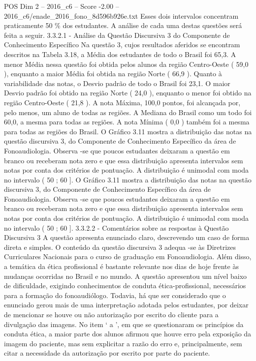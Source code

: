 \begin{textsample}{POS Dim 2 – 2016\_c6 – Score -2.00 – 2016\_c6/enade\_2016\_fono\_8d596b926e.txt}
Esses dois intervalos concentram praticamente 50 \% dos estudantes.
A análise de cada uma destas questões será feita a seguir. 3.3.2.1 - Análise da Questão Discursiva 3 do Componente de Conhecimento Específico Na questão 3, cujos resultados aferidos se encontram descritos na Tabela 3.18, a Média dos estudantes de todo o Brasil foi 65,3.
A menor Média nessa questão foi obtida pelos alunos da região Centro-Oeste ( 59,0 ), enquanto a maior Média foi obtida na região Norte ( 66,9 ).
Quanto à variabilidade das notas, o Desvio padrão de todo o Brasil foi 23,1.
O maior Desvio padrão foi obtido na região Norte ( 24,0 ), enquanto o menor foi obtido na região Centro-Oeste ( 21,8 ).
A nota Máxima, 100,0 pontos, foi alcançada por, pelo menos, um aluno de todas as regiões.
A Mediana do Brasil como um todo foi 60,0, a mesma para todas as regiões.
A nota Mínima ( 0,0 ) também foi a mesma para todas as regiões do Brasil.
O Gráfico 3.11 mostra a distribuição das notas na questão discursiva 3, do Componente de Conhecimento Específico da área de Fonoaudiologia.
Observa -se que poucos estudantes deixaram a questão em branco ou receberam nota zero e que essa distribuição apresenta intervalos sem notas por conta dos critérios de pontuação.
A distribuição é unimodal com moda no intervalo ( 50 ; 60 ].
O Gráfico 3.11 mostra a distribuição das notas na questão discursiva 3, do Componente de Conhecimento Específico da área de Fonoaudiologia.
Observa -se que poucos estudantes deixaram a questão em branco ou receberam nota zero e que essa distribuição apresenta intervalos sem notas por conta dos critérios de pontuação.
A distribuição é unimodal com moda no intervalo ( 50 ; 60 ]. 3.3.2.2 - Comentários sobre as respostas à Questão Discursiva 3 A questão apresenta enunciado claro, descrevendo um caso de forma direta e simples.
O conteúdo da questão discursiva 3 adequa -se às Diretrizes Curriculares Nacionais para o curso de graduação em Fonoaudiologia.
Além disso, a temática da ética profissional é bastante relevante nos dias de hoje frente às mudanças ocorridas no Brasil e no mundo.
A questão apresentou um nível baixo de dificuldade, exigindo conhecimentos de conduta ética-profissional, necessários para a formação do fonoaudiólogo.
Todavia, há que ser considerado que o enunciado gerou mais de uma interpretação adotada pelos estudantes, por deixar de mencionar se houve ou não autorização por escrito do cliente para a divulgação das imagens.
No item ‘ a ’, em que se questionaram os princípios da conduta ética, a maior parte dos alunos afirmou que houve erro pela exposição da imagem do paciente, mas sem explicitar a razão do erro e, principalmente, sem citar a necessidade da autorização por escrito por parte do paciente.

\end{textsample}
